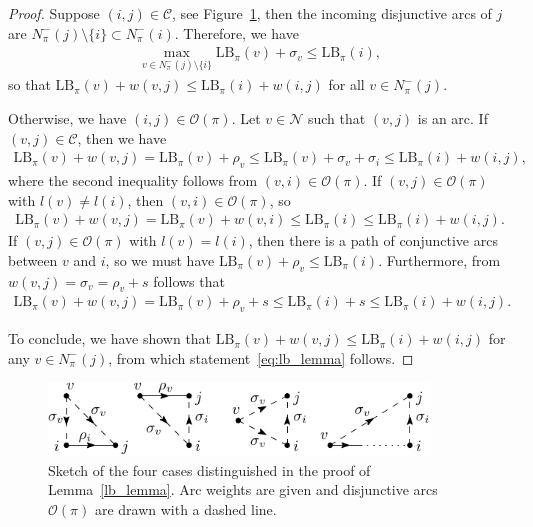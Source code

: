 \documentclass[a4paper]{article}
\theoremstyle{definition}
\theoremstyle{plain}
\begin{document}
\begin{proof}
  Suppose $(i,j) \in \mathcal{C}$, see Figure~\ref{fig:lb_lemma},
  then the incoming disjunctive arcs of $j$ are
  $N^{-}_{\pi}(j) \setminus \{ i \} \subset N^{-}_{\pi}(i)$. Therefore, we have
  \begin{align*}
    \max_{v \in N^{-}_{\pi}(j) \setminus \{i\}} \text{LB}_\pi(v) + \sigma_{v} \leq \text{LB}_\pi(i) ,
  \end{align*}
  so that
      $\text{LB}_\pi(v) + w(v,j) \leq \text{LB}_\pi(i) + w(i,j)$
  for all $v \in N_{\pi}^{-}(j)$.

  Otherwise, we have $(i, j) \in \mathcal{O}(\pi)$.
  Let $v \in \mathcal{N}$ such that $(v, j)$ is an arc.
  If $(v,j) \in \mathcal{C}$, then we have
  \begin{align*}
    \text{LB}_\pi(v) + w(v,j) =
    \text{LB}_\pi(v) + \rho_{v} \leq \text{LB}_\pi(v) + \sigma_{v} + \sigma_{i} \leq \text{LB}_\pi(i) + w(i,j) ,
  \end{align*}
  where the second inequality follows from $(v,i) \in \mathcal{O}(\pi)$.
  If $(v, j) \in \mathcal{O}(\pi)$ with $l(v) \neq l(i)$, then $(v,i) \in \mathcal{O}(\pi)$, so
  \begin{align*}
    \text{LB}_\pi(v) + w(v, j) = \text{LB}_\pi(v) + w(v, i) \leq \text{LB}_\pi(i) \leq \text{LB}_\pi(i) + w(i,j) .
  \end{align*}
  If $(v, j) \in \mathcal{O}(\pi)$ with $l(v) = l(i)$, then there is a path of conjunctive arcs between $v$ and
  $i$, so we must have $\text{LB}_\pi(v) + \rho_{v} \leq \text{LB}_\pi(i)$.
  Furthermore, from $w(v,j) = \sigma_{v} = \rho_{v} + s$ follows that
  \begin{align*}
    \text{LB}_\pi(v) + w(v,j) = \text{LB}_\pi(v) + \rho_{v} + s \leq \text{LB}_\pi(i) + s \leq \text{LB}_\pi(i) + w(i, j) .
  \end{align*}

  To conclude, we have shown that
  $\text{LB}_\pi(v) + w(v,j) \leq \text{LB}_\pi(i) + w(i,j)$ for any
  $v \in N^{-}_{\pi}(j)$, from which statement~\eqref{eq:lb_lemma} follows.
\end{proof}

\begin{figure}
  \centering
  \includegraphics[width=0.9\textwidth]{figures/single/lower-bound-lemma.pdf}
  \caption{Sketch of the four cases distinguished in the proof of
    Lemma~\ref{lb_lemma}. Arc weights are given and disjunctive arcs
    $\mathcal{O}(\pi)$ are drawn with a dashed line.}\label{fig:lb_lemma}
\end{figure}
\end{document}
